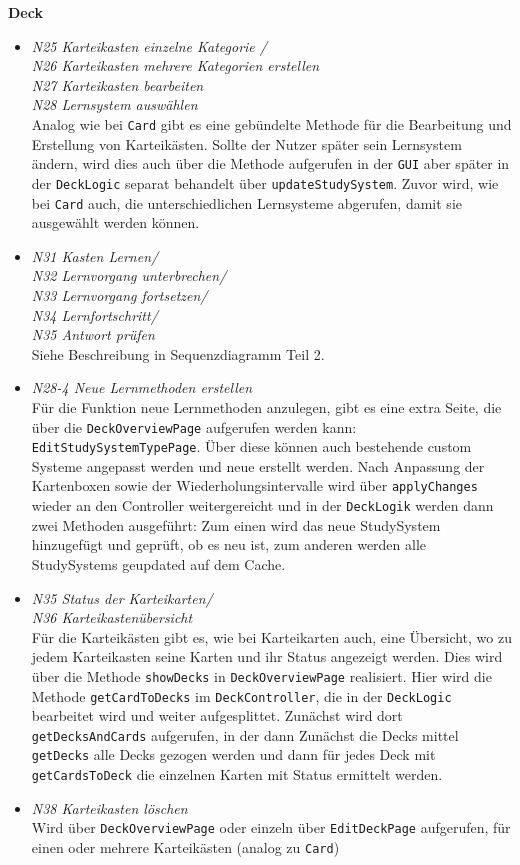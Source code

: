 \documentclass[fontsize=12pt,paper=A4,twoside]{scrartcl}
\begin{document}
    \textbf{\large Deck}
    \begin{itemize}
    \item\textit{N25 Karteikasten einzelne Kategorie / \\
    N26 Karteikasten mehrere Kategorien erstellen\\
    N27 Karteikasten bearbeiten\\
    N28 Lernsystem auswählen}\\
    Analog wie bei \texttt{Card} gibt es eine gebündelte Methode für die Bearbeitung und Erstellung von Karteikästen.
    Sollte der Nutzer später sein Lernsystem ändern, wird dies auch über die Methode aufgerufen in der \texttt{GUI} aber später in der \texttt{DeckLogic}
    separat behandelt über \texttt{updateStudySystem}.
    Zuvor wird, wie bei \texttt{Card} auch, die unterschiedlichen Lernsysteme abgerufen, damit sie ausgewählt werden können.
    \item \textit{N31 Kasten Lernen/ \\
    N32 Lernvorgang unterbrechen/ \\
    N33 Lernvorgang fortsetzen/ \\
    N34 Lernfortschritt/ \\
    N35 Antwort prüfen} \\ Siehe Beschreibung in Sequenzdiagramm Teil 2.
    \item \textit{N28-4 Neue Lernmethoden erstellen}\\
    Für die Funktion neue Lernmethoden anzulegen, gibt es eine extra Seite, die über die \texttt{DeckOverviewPage} aufgerufen werden kann: \texttt{EditStudySystemTypePage}.
    Über diese können auch bestehende custom Systeme angepasst werden und neue erstellt werden. Nach Anpassung der Kartenboxen sowie der Wiederholungsintervalle wird über \texttt{applyChanges} 
    wieder an den Controller weitergereicht und in der \texttt{DeckLogik} werden dann zwei Methoden ausgeführt: Zum einen wird das neue StudySystem hinzugefügt und geprüft, ob es neu ist, zum anderen
    werden alle StudySystems geupdated auf dem Cache.
    \item \textit{N35 Status der Karteikarten/ \\ N36 Karteikastenübersicht}\\ 
    Für die Karteikästen gibt es, wie bei Karteikarten auch, eine Übersicht, wo zu jedem Karteikasten seine Karten und ihr Status angezeigt werden.
    Dies wird über die Methode \texttt{showDecks} in \texttt{DeckOverviewPage} realisiert. Hier wird die Methode \texttt{getCardToDecks} im \texttt{DeckController}, 
    die in der \texttt{DeckLogic} bearbeitet wird und weiter aufgesplittet. Zunächst wird dort \texttt{getDecksAndCards} aufgerufen, in der dann Zunächst
    die Decks mittel \texttt{getDecks} alle Decks gezogen werden und dann für jedes Deck mit \texttt{getCardsToDeck} die einzelnen Karten mit Status
    ermittelt werden.
    \item\textit{ N38 Karteikasten löschen}\\ Wird über \texttt{DeckOverviewPage} oder einzeln über \texttt{EditDeckPage} aufgerufen, für einen oder mehrere Karteikästen (analog zu \texttt{Card})
    \end{itemize}
\end{document}
